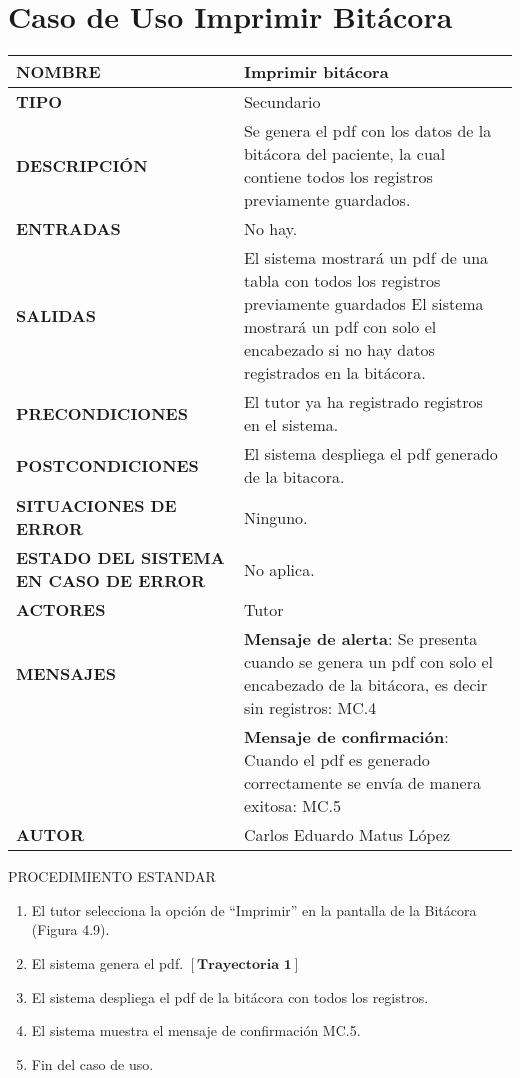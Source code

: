 \section{Caso de Uso Imprimir Bitácora}
\begin{longtable}{ | p{6cm} | p{10cm} |}
\hline
      \textbf{NOMBRE} & Imprimir bitácora\\
      \hline
      \textbf{TIPO} & Secundario\\
      \hline
      \textbf{DESCRIPCIÓN} & Se genera el pdf  con los datos de la bitácora del paciente, la cual contiene  todos los registros previamente guardados.\\
      \hline
      \textbf{ENTRADAS} & No hay.\\
      \hline
      \textbf{SALIDAS} & El sistema mostrará un pdf de una tabla con todos los registros previamente guardados \newline El sistema mostrará un pdf con solo el encabezado si no hay datos registrados en la bitácora.\\
      \hline
      \textbf{PRECONDICIONES} & El tutor ya ha registrado registros en el sistema.\\
      \hline
      \textbf{POSTCONDICIONES} & El sistema despliega el pdf generado de la bitacora.\\
      \hline
      \textbf{SITUACIONES DE ERROR} & Ninguno.\\
      \hline
      \textbf{ESTADO DEL SISTEMA EN CASO DE ERROR} &  No aplica.\\
      \hline
      \textbf{ACTORES} & Tutor\\
      \hline
      \textbf{MENSAJES} & \textbf{Mensaje de alerta}: Se presenta cuando se genera un pdf con solo el encabezado de la bitácora, es decir sin registros: MC.4\\& \textbf{Mensaje de confirmación}: Cuando el pdf es generado correctamente se envía de manera exitosa: MC.5\\
      \hline
      \textbf{AUTOR} & Carlos Eduardo Matus López \\
	  \hline
\end{longtable}
\vspace*{1cm}
\Large{PROCEDIMIENTO ESTANDAR}
\large{}
\begin{enumerate}
\item El tutor selecciona la opción de “Imprimir” en la pantalla de la Bitácora (Figura 4.9).
\item El sistema genera el pdf. $\left[\textbf{Trayectoria 1}\right]$
\item El sistema despliega el pdf de la bitácora con todos los registros.
\item El sistema muestra el mensaje de confirmación MC.5.
\item Fin del caso de uso.
\end{enumerate}
